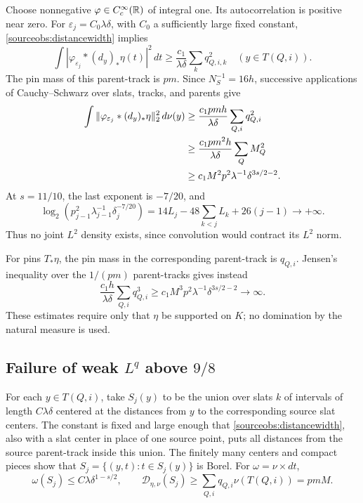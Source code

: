 Choose nonnegative \(\varphi\in C_c^\infty(\mathbb R)\) of integral one.
Its autocorrelation is positive near zero. For
\(\varepsilon_j=C_0\lambda\delta\), with \(C_0\) a sufficiently
large fixed constant, \eqref{sourceobs:distancewidth} implies
\[
 \int|\varphi_{\varepsilon_j}*(d_y)_*\eta(t)|^2\,dt
 \ge\frac{c_1}{\lambda\delta}\sum_kq_{Q,i,k}^2
 \quad(y\in T(Q,i)).
\]
The pin mass of this parent-track is \(pm\). Since
\(N_S^{-1}=16h\), successive applications of Cauchy--Schwarz
over slats, tracks, and parents give
\begin{align}
 \int\|\varphi_{\varepsilon_j}*(d_y)_*\eta\|_2^2\,d\nu(y)
 &\ge\frac{c_1pmh}{\lambda\delta}\sum_{Q,i}q_{Q,i}^2
 \notag\\
 &\ge\frac{c_1pm^2h}{\lambda\delta}\sum_QM_Q^2
 \notag\\
 &\ge c_1M^2p^2\lambda^{-1}\delta^{3s/2-2}.
 \label{sourceobs:collision}
\end{align}
At \(s=11/10\), the last exponent is \(-7/20\), and
\[
 \log_2(p_{j-1}^2\lambda_{j-1}^{-1}\delta_j^{-7/20})
 =14L_j-48\sum_{k<j}L_k+26(j-1)\longrightarrow+\infty.
\]
Thus no joint \(L^2\) density exists, since convolution would
contract its \(L^2\) norm.

For pins \(T_*\eta\), the pin mass in the corresponding parent-track
is \(q_{Q,i}\). Jensen's inequality over the \(1/(pm)\)
parent-tracks gives instead
\[
 \frac{c_1h}{\lambda\delta}\sum_{Q,i}q_{Q,i}^3
 \ge c_1M^3p^2\lambda^{-1}\delta^{3s/2-2}\longrightarrow\infty.
\]
These estimates require only that \(\eta\) be supported on \(K\);
no domination by the natural measure is used.

\subsection{Failure of weak \(L^q\) above \(9/8\)}

For each \(y\in T(Q,i)\), take \(S_j(y)\) to be the union over
slats \(k\) of intervals of length \(C\lambda\delta\) centered
at the distances from \(y\) to the corresponding source slat
centers. The constant is fixed and large enough that
\eqref{sourceobs:distancewidth}, also with a slat center in place
of one source point, puts all distances from the source
parent-track inside this union. The finitely many centers and
compact pieces show that \(S_j=\{(y,t):t\in S_j(y)\}\) is Borel.
For \(\omega=\nu\times dt\),
\begin{equation}\label{sourceobs:support}
 \omega(S_j)\le C\lambda\delta^{1-s/2},\qquad
 \mathcal D_{\eta,\nu}(S_j)\ge
 \sum_{Q,i}q_{Q,i}\nu(T(Q,i))=pmM.
\end{equation}

